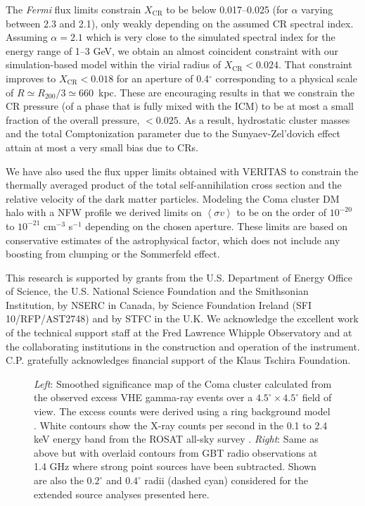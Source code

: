 \documentclass[12pt,manuscript]{aastex}
\def\Fermi{{\em Fermi}\xspace}
\newcommand{\expval}[1]{\left\langle #1 \right\rangle}
\newcommand{\CR}{\mathrm{CR}}
\begin{document}
The \Fermi flux limits constrain $X_\CR$ to be below 0.017--0.025 (for $\alpha$ varying
between 2.3 and 2.1), only weakly depending on the assumed CR spectral index. Assuming $\alpha=2.1$
which is very close to the simulated spectral index for the energy range of 1--3 GeV, we obtain an
almost coincident constraint with our simulation-based model within the virial radius of
$X_\CR<0.024$. That constraint improves to $X_{\CR}<0.018$ for an aperture of 0.4$^\circ$
corresponding to a physical scale of $R \simeq R_{200}/3 \simeq 660$~kpc. These are encouraging
results in that we constrain the CR pressure (of a phase that is fully mixed with the ICM) to be at
most a small fraction of the overall pressure, $<0.025$. As a result, hydrostatic cluster masses
and the total Comptonization parameter due to the Sunyaev-Zel'dovich effect attain at most a very
small bias due to CRs.

We have also used the flux upper limits obtained with VERITAS to constrain the thermally averaged
product of the total self-annihilation cross section and the relative velocity of the dark matter
particles. Modeling the Coma cluster DM halo with a NFW profile we derived limits on
$\expval{\sigma v}$ to be on the order of $10^{-20}$ to $10^{-21}$ cm$^{-3}$ s$^{-1}$ depending on
the chosen aperture. These limits are based on conservative estimates of the astrophysical factor,
which does not include any boosting from clumping or the Sommerfeld effect.

\acknowledgments
This research is supported by grants from the U.S. Department of Energy Office of Science, the U.S.
National Science Foundation and the Smithsonian Institution, by NSERC in Canada, by Science
Foundation Ireland (SFI 10/RFP/AST2748) and by STFC in the U.K. We acknowledge the excellent work
of the technical support staff at the Fred Lawrence Whipple Observatory and at the collaborating
institutions in the construction and operation of the instrument. C.P. gratefully acknowledges 
financial support of the Klaus Tschira Foundation.





\begin{figure*}
\begin{center}
\end{center}
\caption{\emph{Left}: Smoothed significance map of the Coma cluster calculated from the observed
excess VHE gamma-ray events over a $4.5^{\circ}\times 4.5^{\circ}$ field of view. The excess counts
were derived using a ring background model \citep{article:Aharonian_etal:2001}. White contours show
the X-ray counts per second in the 0.1 to 2.4 keV energy band from the ROSAT all-sky survey
\citep{article:BrielHenryBohringer:1992}. \emph{Right}: Same as above but with overlaid contours
from GBT radio observations at 1.4 GHz \citep{article:BrownRudnick:2010} where strong point sources
have been subtracted. Shown are also the $0.2^{\circ}$ and $0.4^{\circ}$ radii (dashed cyan)
considered for the extended source analyses presented here.}
\label{fig:skymaps}
\end{figure*}
\end{document}
